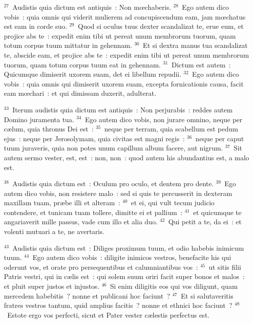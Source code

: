 ${}^{27}$~Audistis quia dictum est antiquis~: Non mœchaberis.
${}^{28}$~Ego autem dico vobis~: quia omnis qui viderit mulierem ad concupiscendum eam, jam mœchatus est eam in corde suo.
${}^{29}$~Quod si oculus tuus dexter scandalizat te, erue eum, et projice abs te~: expedit enim tibi ut pereat unum membrorum tuorum, quam totum corpus tuum mittatur in gehennam.
${}^{30}$~Et si dextra manus tua scandalizat te, abscide eam, et projice abs te~: expedit enim tibi ut pereat unum membrorum tuorum, quam totum corpus tuum eat in gehennam.
${}^{31}$~Dictum est autem~: Quicumque dimiserit uxorem suam, det ei libellum repudii.
${}^{32}$~Ego autem dico vobis~: quia omnis qui dimiserit uxorem suam, excepta fornicationis causa, facit eam mœchari~: et qui dimissam duxerit, adulterat.


${}^{33}$~Iterum audistis quia dictum est antiquis~: Non perjurabis~: reddes autem Domino juramenta tua.
${}^{34}$~Ego autem dico vobis, non jurare omnino, neque per c\ae lum, quia thronus Dei est~:
${}^{35}$~neque per terram, quia scabellum est pedum ejus~: neque per Jerosolymam, quia civitas est magni regis~:
${}^{36}$~neque per caput tuum juraveris, quia non potes unum capillum album facere, aut nigrum.
${}^{37}$~Sit autem sermo vester, est, est~: non, non~: quod autem his abundantius est, a malo est.


${}^{38}$~Audistis quia dictum est~: Oculum pro oculo, et dentem pro dente.
${}^{39}$~Ego autem dico vobis, non resistere malo~: sed si quis te percusserit in dexteram maxillam tuam, pr\ae be illi et alteram~:
${}^{40}$~et ei, qui vult tecum judicio contendere, et tunicam tuam tollere, dimitte ei et pallium~:
${}^{41}$~et quicumque te angariaverit mille passus, vade cum illo et alia duo.
${}^{42}$~Qui petit a te, da ei~: et volenti mutuari a te, ne avertaris.


${}^{43}$~Audistis quia dictum est~: Diliges proximum tuum, et odio habebis inimicum tuum.
${}^{44}$~Ego autem dico vobis~: diligite inimicos vestros, benefacite his qui oderunt vos, et orate pro persequentibus et calumniantibus vos~:
${}^{45}$~ut sitis filii Patris vestri, qui in c\ae lis est~: qui solem suum oriri facit super bonos et malos~: et pluit super justos et injustos.
${}^{46}$~Si enim diligitis eos qui vos diligunt, quam mercedem habebitis~? nonne et publicani hoc faciunt~?
${}^{47}$~Et si salutaveritis fratres vestros tantum, quid amplius facitis~? nonne et ethnici hoc faciunt~?
${}^{48}$~Estote ergo vos perfecti, sicut et Pater vester c\ae lestis perfectus est.

